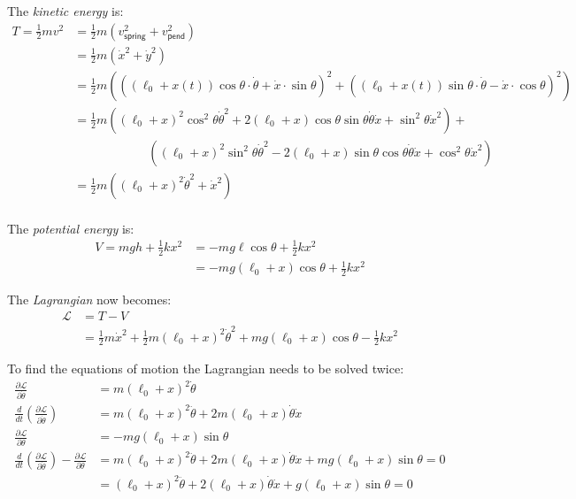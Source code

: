 \documentclass[letterpaper,8pt]{article}
\begin{document}
The \emph{kinetic energy} is:
\begin{align*}
T = \frac{1}{2}mv^2 &= \frac{1}{2}m \left( v_\mathsf{spring}^2 + v_\mathsf{pend}^2 \right) \\
      &= \frac{1}{2}m \left( \dot{x}^2 + \dot{y}^2 \right) \\
      &= \frac{1}{2}m \left( ((\ell_0 + x(t)) \cos \theta \cdot \dot{\theta} + \dot{x} \cdot \sin \theta)^2 + ((\ell_0 + x(t)) \sin \theta\cdot\dot{\theta} - \dot{x} \cdot \cos \theta)^2 \right) \\
      &= \frac{1}{2}m \left( (\ell_0 + x)^2 \cos^2 \theta \dot{\theta}^2 + 2(\ell_0 + x)\cos \theta\sin \theta \dot{\theta} \dot{x}+ \sin^2 \theta\dot{x}^2 \right) + \\ 
      & \qquad\qquad\qquad \left( (\ell_0 + x)^2 \sin^2 \theta \dot{\theta}^2 - 2(\ell_0 + x)\sin \theta\cos \theta \dot{\theta} \dot{x} + \cos^2 \theta \dot{x}^2 \right) \\
      &= \frac{1}{2}m \left( (\ell_0 + x)^2 \dot{\theta}^2 + \dot{x}^2 \right) \\
\end{align*}

The \emph{potential energy} is:
\begin{align*}
V = mgh + \frac{1}{2} kx^2 
  &= -mg\ell\cos\theta + \frac{1}{2} kx^2 \\
  &= -mg(\ell_0 + x)\cos\theta + \frac{1}{2} kx^2
\end{align*}

The \emph{Lagrangian} now becomes:
\begin{align*}
\mathcal{L} &= T - V \\
  &= \frac{1}{2} m \dot{x}^2 + \frac{1}{2}m (\ell_0 + x)^2 \dot{\theta}^2 + mg(\ell_0 + x)\cos\theta - \frac{1}{2} kx^2
\end{align*}

To find the equations of motion the Lagrangian needs to be solved twice:
\begin{align*}
\frac{\partial \mathcal{L}}{\partial \dot{\theta}} &= m (\ell_0 + x)^2 \dot{\theta} \\
\frac{d}{dt} \left( \frac{\partial \mathcal{L}}{\partial \dot{\theta}} \right) &=  m (\ell_0 + x)^2 \ddot{\theta} + 2m (\ell_0 + x) \dot{\theta} \dot{x}\\
\frac{\partial \mathcal{L}}{\partial \theta} &= -mg(\ell_0 + x)\sin\theta \\
\frac{d}{dt} \left( \frac{\partial \mathcal{L}}{\partial \dot{\theta}} \right) - \frac{\partial \mathcal{L}}{\partial \theta} &=
 m (\ell_0 + x)^2 \ddot{\theta} + 2m (\ell_0 + x) \dot{\theta} \dot{x} + mg(\ell_0 + x)\sin\theta = 0 \\
&= (\ell_0 + x)^2 \ddot{\theta} + 2 (\ell_0 + x) \dot{\theta} \dot{x} + g(\ell_0 + x)\sin\theta = 0
\end{align*}
\end{document}
